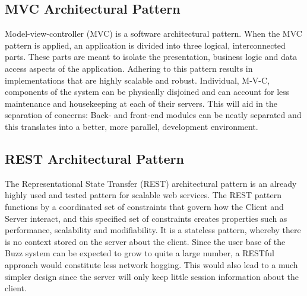 \documentclass[hidelinks, 12pt]{article}
\begin{document}
\subsection{MVC Architectural Pattern}
Model-view-controller (MVC) is a software architectural pattern. When the MVC pattern is applied, an application is divided into three logical, interconnected parts. These parts are meant to isolate the presentation, business logic and data access aspects of the application. Adhering to this pattern results in implementations that are highly scalable and robust. Individual, M-V-C, components of the system can be physically disjoined and can account for less maintenance and housekeeping at each of their servers. This will aid in the separation of concerns: Back- and front-end modules can be neatly separated and this translates into a better, more parallel, development environment.

\subsection{REST Architectural Pattern}
The Representational State Transfer (REST) architectural pattern is an already highly used and tested pattern for scalable web services.
The REST pattern functions by a coordinated set of constraints that govern how the Client and Server interact, and this specified set of constraints creates properties such as performance, scalability and modifiability. 
It is a stateless pattern, whereby there is no context stored on the server about the client.
Since the user base of the Buzz system can be expected to grow to quite a large number, a RESTful approach would constitute less network hogging. This would also lead to a much simpler design since the server will only keep little session information about the client.
\end{document}
